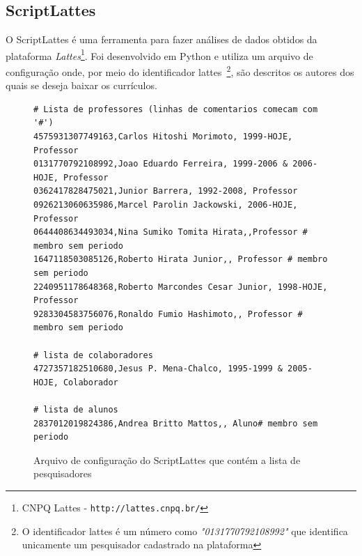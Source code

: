\subsection{ScriptLattes}
O ScriptLattes é uma ferramenta para fazer análises de dados obtidos da plataforma \emph{Lattes}\footnote{CNPQ Lattes - \texttt{http://lattes.cnpq.br/}}. Foi desenvolvido em Python e utiliza um arquivo de configuração onde, por meio do identificador lattes~\footnote{O identificador lattes é um número como \emph{"0131770792108992"} que identifica unicamente um pesquisador cadastrado na plataforma}, são descritos os autores dos quais se deseja baixar os currículos.

\begin{figure}[H]
\begin{verbatim}
# Lista de professores (linhas de comentarios comecam com '#')
4575931307749163,Carlos Hitoshi Morimoto, 1999-HOJE, Professor
0131770792108992,Joao Eduardo Ferreira, 1999-2006 & 2006-HOJE, Professor
0362417828475021,Junior Barrera, 1992-2008, Professor
0926213060635986,Marcel Parolin Jackowski, 2006-HOJE, Professor
0644408634493034,Nina Sumiko Tomita Hirata,,Professor # membro sem periodo
1647118503085126,Roberto Hirata Junior,, Professor # membro sem periodo
2240951178648368,Roberto Marcondes Cesar Junior, 1998-HOJE, Professor
9283304583756076,Ronaldo Fumio Hashimoto,, Professor # membro sem periodo

# lista de colaboradores
4727357182510680,Jesus P. Mena-Chalco, 1995-1999 & 2005-HOJE, Colaborador

# lista de alunos
2837012019824386,Andrea Britto Mattos,, Aluno# membro sem periodo
\end{verbatim}
\caption{Arquivo de configuração do ScriptLattes que contém a lista de pesquisadores}
\label{lst:slattes}
\end{figure}

